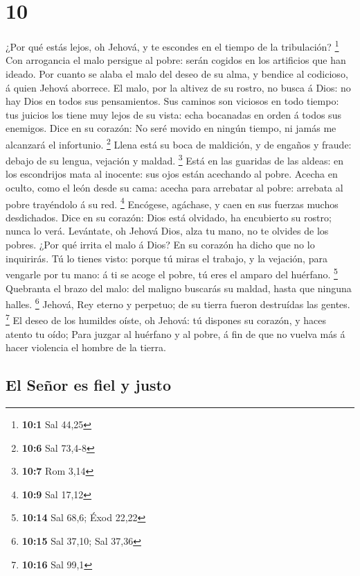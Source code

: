 \hypertarget{section-9}{%
\section{10}\label{section-9}}

 ¿Por qué estás lejos, oh Jehová, y te escondes en el tiempo
de la tribulación? \footnote{\textbf{10:1} Sal 44,25}  Con
arrogancia el malo persigue al pobre: serán cogidos en los artificios
que han ideado.  Por cuanto se alaba el malo del deseo de su
alma, y bendice al codicioso, á quien Jehová aborrece.  El
malo, por la altivez de su rostro, no busca á Dios: no hay Dios en todos
sus pensamientos.  Sus caminos son viciosos en todo tiempo:
tus juicios los tiene muy lejos de su vista: echa bocanadas en orden á
todos sus enemigos.  Dice en su corazón: No seré movido en
ningún tiempo, ni jamás me alcanzará el infortunio. \footnote{\textbf{10:6}
  Sal 73,4-8}  Llena está su boca de maldición, y de engaños
y fraude: debajo de su lengua, vejación y maldad. \footnote{\textbf{10:7}
  Rom 3,14}  Está en las guaridas de las aldeas: en los
escondrijos mata al inocente: sus ojos están acechando al pobre.
 Acecha en oculto, como el león desde su cama: acecha para
arrebatar al pobre: arrebata al pobre trayéndolo á su red. \footnote{\textbf{10:9}
  Sal 17,12}  Encógese, agáchase, y caen en sus fuerzas
muchos desdichados.  Dice en su corazón: Dios está
olvidado, ha encubierto su rostro; nunca lo verá. 
Levántate, oh Jehová Dios, alza tu mano, no te olvides de los pobres.
 ¿Por qué irrita el malo á Dios? En su corazón ha dicho que
no lo inquirirás.  Tú lo tienes visto: porque tú miras el
trabajo, y la vejación, para vengarle por tu mano: á ti se acoge el
pobre, tú eres el amparo del huérfano. \footnote{\textbf{10:14} Sal
  68,6; Éxod 22,22}  Quebranta el brazo del malo: del
maligno buscarás su maldad, hasta que ninguna halles. \footnote{\textbf{10:15}
  Sal 37,10; Sal 37,36}  Jehová, Rey eterno y perpetuo; de
su tierra fueron destruídas las gentes. \footnote{\textbf{10:16} Sal
  99,1}  El deseo de los humildes oíste, oh Jehová: tú
dispones su corazón, y haces atento tu oído;  Para juzgar
al huérfano y al pobre, á fin de que no vuelva más á hacer violencia el
hombre de la tierra.

\hypertarget{el-seuxf1or-es-fiel-y-justo}{%
\subsection{El Señor es fiel y
justo}\label{el-seuxf1or-es-fiel-y-justo}}

